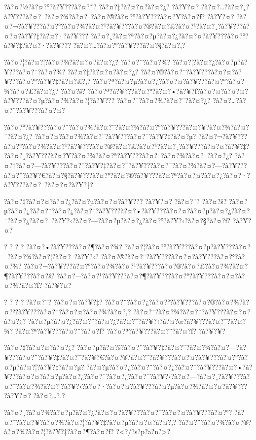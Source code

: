 \documentclass[11pt, openany]{book}
\begin{document}
{{{{{{{{{{{{{{?à?¤?½?à?¤?°?à?¥???à?¤?˜? ?à?¤?‡?à?¤?¤?à?¤?¿? ?à?¥?¤?
?à?¤?\ldots{}?à?¤?¸?à?¥???à?¤?¯?à?¤?¾?à?¤?¯?à?¤?®?à?¤?°?à?¥???à?¤?¥?à?¤?ƒ?
?à?¥?¤?
?à?¤?¬?à?¥???à?¤?°?à?¤?¾?à?¤?¹?à?¥???à?¤?®?à?¤?£?à?¤?¹?à?¤?¸?à?¥???à?¤?¤?à?¥?‡?à?¤?·?à?¥???
?à?¤?¸?à?¤?ª?à?¤?µ?à?¤?¿?à?¤?¤?à?¥???à?¤?°?à?¥?‡?à?¤?·?à?¥???
?à?¤?\ldots{}?à?¤?°?à?¥???à?¤?§?à?¤?‚?

?à?¤?¦?à?¤?¦?à?¤?¾?à?¤?¤?à?¤?¿? ?à?¤?¯?à?¤?¾?
?à?¤?¦?à?¤?¿?à?¤?µ?à?¥???à?¤?¯?à?¤?¾? ?à?¤?‡?à?¤?¤?à?¤?¿?
?à?¤?®?à?¤?¨?à?¥???à?¤?¤?à?¥???à?¤?°?à?¥?‡?à?¤?£?,?
?à?¤?ª?à?¤?µ?à?¤?¿?à?¤?¤?à?¥???à?¤?°?à?¤?¾?à?¤?£?à?¤?¿? ?à?¤?š?
?à?¤?ª?à?¥???à?¤?°?à?¤?•?à?¥?ƒ?à?¤?¤?à?¤?¤?à?¥???à?¤?µ?à?¤?¾?à?¤?¦?à?¥???
?à?¤?¯?à?¤?¾?à?¤?¨?à?¤?¿? ?à?¤?\ldots{}?à?¤?¨?à?¥???à?¤?¤?

?à?¤?°?à?¥???à?¤?˜?à?¤?¾?à?¤?¨?à?¤?¾?à?¤?°?à?¥???à?¤?¥?à?¤?¾?à?¤?¨?à?¤?¿?
?à?¤?¤?à?¤?¾?à?¤?¨?à?¥???à?¤?¯?à?¥?‡?à?¤?µ?
?à?¤?¬?à?¥???à?¤?°?à?¤?¾?à?¤?¹?à?¥???à?¤?®?à?¤?£?à?¤?¹?à?¤?¸?à?¥???à?¤?¤?à?¥?‡?
?à?¤?¸?à?¥???à?¤?¥?à?¤?¾?à?¤?ª?à?¥???à?¤?¯?à?¤?¾?à?¤?¨?à?¤?¿?
?à?¤?†?à?¤?---?à?¥???à?¤?¨?à?¥?‡?à?¤?¯?à?¥???à?¤?¯?à?¤?¾?à?¤?---?à?¥???à?¤?¨?à?¥?€?à?¤?§?à?¥???à?¤?°?à?¤?®?à?¥???à?¤?ª?à?¤?¤?à?¤?¿?à?¤?·?à?¥???à?¤?~?à?¤?¤?à?¥?‡?

?à?¤?‡?à?¤?¤?à?¤?¿?à?¤?µ?à?¤?¤?à?¥??? ?à?¥?¤? ?à?¤?¨? ?à?¤?š?
?à?¤?µ?à?¤?¿?à?¤?¨?à?¤?¿?à?¤?¯?à?¥???à?¤?•?à?¥???à?¤?¤?à?¤?µ?à?¤?¿?à?¤?¨?à?¤?¿?à?¤?¯?à?¥?‹?à?¤?---?à?¤?µ?à?¤?¿?à?¤?°?à?¥?‹?à?¤?§?à?¤?ƒ?
?à?¥?¤?

? ? ? ? ?à?¤?•?à?¥???à?¤?¶?à?¤?¾?
?à?¤?¦?à?¤?°?à?¥???à?¤?µ?à?¥???à?¤?¯?à?¤?¾?à?¤?¦?à?¤?¯?à?¥?‹?
?à?¤?®?à?¤?¨?à?¥???à?¤?¤?à?¥???à?¤?°?à?¤?¾?
?à?¤?¬?à?¥???à?¤?°?à?¤?¾?à?¤?¹?à?¥???à?¤?®?à?¤?£?à?¤?¾?à?¤?¶?à?¥???à?¤?š?
?à?¤?¬?à?¤?¹?à?¥???à?¤?¶?à?¥???à?¤?°?à?¥???à?¤?¤?à?¤?¾?à?¤?ƒ? ?à?¥?¤?

? ? ? ? ?à?¤?¨? ?à?¤?¤?à?¥?‡?
?à?¤?¨?à?¤?¿?à?¤?°?à?¥???à?¤?®?à?¤?¾?à?¤?²?à?¥???à?¤?¯?à?¤?¤?à?¤?¾?à?¤?‚?
?à?¤?¯?à?¤?¾?à?¤?¨?à?¥???à?¤?¤?à?¤?¿?
?à?¤?µ?à?¤?¿?à?¤?¨?à?¤?¿?à?¤?¯?à?¥?‹?à?¤?œ?à?¥???à?¤?¯?à?¤?¾?
?à?¤?ª?à?¥???à?¤?¨?à?¤?ƒ? ?à?¤?ª?à?¥???à?¤?¨?à?¤?ƒ? ?à?¥?¥?

?à?¤?‡?à?¤?¤?à?¤?¿?
?à?¤?µ?à?¤?š?à?¤?¨?à?¥?‡?à?¤?¨?à?¤?¾?à?¤?---?à?¥???à?¤?¨?à?¥?‡?à?¤?¯?à?¥?€?à?¤?®?à?¤?¨?à?¥???à?¤?¤?à?¥???à?¤?°?à?¤?µ?à?¤?¦?à?¥?‡?à?¤?µ?
?à?¤?µ?à?¤?¿?à?¤?¨?à?¤?¿?à?¤?¯?à?¥???à?¤?•?à?¥???à?¤?¤?à?¤?µ?à?¤?¿?à?¤?¨?à?¤?¿?à?¤?¯?à?¥?‹?à?¤?---?à?¤?¸?à?¥???à?¤?¯?à?¤?¾?à?¤?¦?à?¥?‹?à?¤?·?à?¤?¤?à?¥???à?¤?µ?à?¤?¾?à?¤?¤?à?¥???
?à?¥?¤? ?à?¤?\ldots{}?.?

?à?¤?¸?à?¤?¾?à?¤?µ?à?¤?¿?à?¤?¤?à?¥???à?¤?¯?à?¤?¤?à?¥???à?¤?°?
?à?¤?¯?à?¤?¥?à?¤?¾?à?¤?¦?à?¥?‡?à?¤?µ?à?¤?¤?à?¤?‚?
?à?¤?¨?à?¤?¾?à?¤?®?à?¤?¾?à?¤?¦?à?¥?‡?à?¤?¶?à?¤?ƒ?
?\textless{}?/?s?p?a?n?\textgreater{}?

}}}}}}}}}}}}}}
\end{document}
